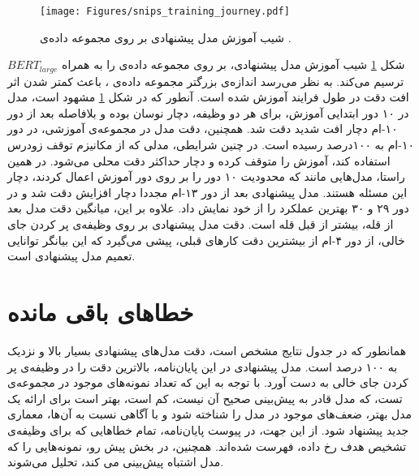 \begin{figure}[!htb]
	\centering
	\texttt{[image: Figures/snips\_training\_journey.pdf]}
	\caption{شیب آموزش مدل پیشنهادی بر روی مجموعه داده‌ی .}
	\label{Fig:snips_journey}
\end{figure}
شکل \ref{Fig:snips_journey} شیب آموزش مدل پیشنهادی، بر روی مجموعه داده‌ی  را به همراه $BERT_{large}$ ترسیم می‌کند. به نظر می‌رسد اندازه‌ی بزرگتر مجموعه داده‌ی ، باعث کمتر شدن اثر افت دقت در طول فرایند آموزش شده است. آنطور که در شکل \ref{Fig:snips_journey} مشهود است، مدل در ۱۰ دور ابتدایی آموزش، برای هر دو وظیفه، دچار نوسان بوده و بلافاصله بعد از دور ۱۰-ام دچار افت شدید دقت شد. همچنین، دقت مدل در مجموعه‌ی آموزشی، در دور ۱۰-ام به ۱۰۰درصد رسیده است. در چنین شرایطی، مدلی که از مکانیزم توقف زودرس استفاده کند، آموزش را متوقف کرده و دچار حداکثر دقت محلی می‌شود. در همین راستا، مدل‌هایی مانند \cite{e:2019,goo-etal-2018-slot} که محدودیت ۱۰ دور را بر روی دور آموزش اعمال کردند، دچار این مسئله هستند. مدل پیشنهادی بعد از دور ۱۳-ام مجددا دچار افزایش دقت شد و در دور ۲۹ و ۳۰ بهترین عملکرد را از خود نمایش داد. علاوه بر این، میانگین دقت مدل بعد از قله، بیشتر از قبل قله است. دقت مدل پیشنهادی بر روی وظیفه‌ی پر کردن جای خالی، از دور ۴-ام از بیشترین دقت کارهای قبلی، پیشی می‌گیرد که این بیانگر توانایی تعمیم مدل پیشنهادی است.
\section{خطاهای باقی مانده}
همانطور که در جدول نتایج مشخص است، دقت مدل‌های پیشنهادی بسیار بالا و نزدیک به ۱۰۰ درصد است. مدل پیشنهادی در این پایان‌نامه، بالاترین دقت را در وظیفه‌ی پر کردن جای خالی به دست آورد. با توجه به این که تعداد نمونه‌های موجود در مجموعه‌ی تست، که مدل قادر به پیش‌بینی صحیح آن نیست، کم است، بهتر است برای ارائه یک مدل بهتر، ضعف‌های موجود در مدل را شناخته شود و با آگاهی نسبت به آن‌ها، معماری جدید پیشنهاد شود. از این جهت، در پیوست پایان‌نامه، تمام خطاهایی که برای وظیفه‌ی تشخیص هدف رخ داده، فهرست شده‌اند. همچنین، در بخش پیش رو، نمونه‌هایی را که مدل اشتباه پیش‌بینی می کند، تحلیل می‌شوند.
